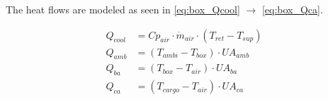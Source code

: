 
The heat flows are modeled as seen in \cref{eq:box_Qcool} $\rightarrow$ \cref{eq:box_Qca}.

\begin{align}
	Q_{cool}   & = Cp_{air} \cdot \dot{m}_{air} \cdot (T_{ret} - T_{sup})	\label{eq:box_Qcool} \\
	Q_{amb}    & = (T_{ambi} - T_{box}) \cdot U A_{amb}						\label{eq:box_Qab}   \\
	Q_{ba}     & = (T_{box} - T_{air}) \cdot U A_{ba}						\label{eq:box_Qba}   \\
	Q_{ca}     & = (T_{cargo} - T_{air}) \cdot U A_{ca}                  	\label{eq:box_Qca}   \\
\end{align}

